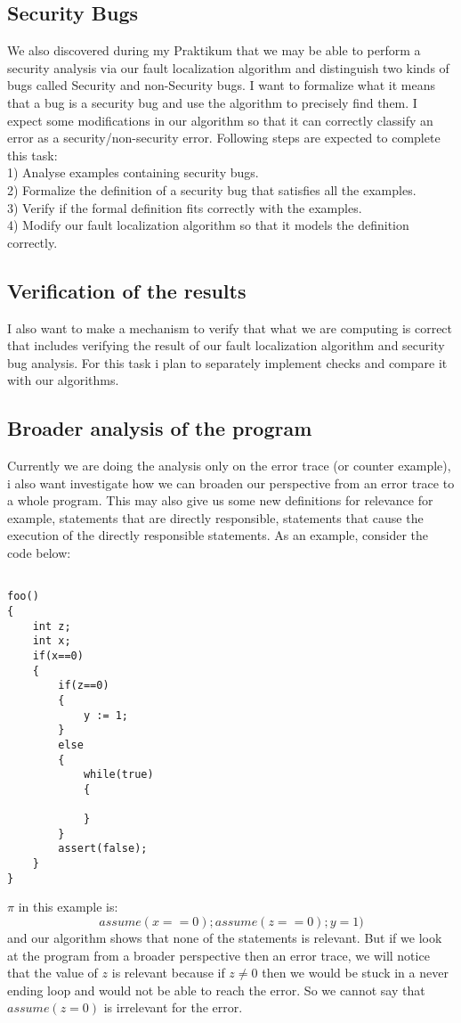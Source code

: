 \documentclass{article}
\begin{document}
\subsection{Security Bugs}
We also discovered during my Praktikum that we may be able to perform a security analysis via our fault localization algorithm and distinguish two kinds of bugs called Security and non-Security bugs. I want to formalize what it means that a bug is a security bug and use the algorithm to precisely find them. I expect some modifications in our algorithm so that it can correctly classify an error as a security/non-security error. Following steps are expected to complete this task: \\
1) Analyse examples containing security bugs. \\
2) Formalize the definition of a security bug that satisfies all the examples. \\
3) Verify if the formal definition fits correctly with the examples. \\
4) Modify our fault localization algorithm so that it models the definition correctly.
\subsection{Verification of the results}
I also want to make a mechanism to verify that what we are computing is correct that includes verifying the result of our fault localization algorithm and security bug analysis. For this task i plan to separately implement checks and compare it with our algorithms.
\subsection{Broader analysis of the program}
Currently we are doing the analysis only on the error trace (or counter example), i also want investigate how we can broaden our perspective from an error trace to a whole program. This may also give us some new definitions for relevance for example, statements that are directly responsible, statements that cause the execution of the directly responsible statements. As an example, consider the code below:\\
\begin{lstlisting}

foo()
{
	int z;
	int x;
	if(x==0)
	{
		if(z==0)
		{
			y := 1;
		}
		else
		{
			while(true)
			{
				
			}
		}		
		assert(false);
	}	
}

\end{lstlisting}
$\pi$ in this example is:
$$ assume(x==0); assume(z==0); y=1) $$
and our algorithm shows that none of the statements is relevant. But if we look at the program from a broader perspective then an error trace, we will notice that the value of  $z$ is relevant because if $z \neq 0$ then we would be stuck in a never ending loop and would not be able to reach the error.  
So we cannot say that $assume(z=0)$ is irrelevant for the error.
\end{document}
